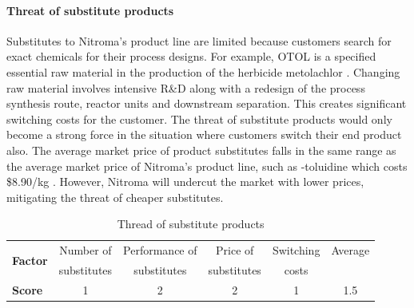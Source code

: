 \paragraph{Threat of substitute products}
Substitutes to Nitroma’s product line are limited because customers search for exact chemicals for their process designs. For example, OTOL is a specified essential raw material in the production of the herbicide metolachlor \cite{ncbi_ortho-toluidine_nodate}. Changing raw material involves intensive R\&D along with a redesign of the process synthesis route, reactor units and downstream separation. This creates significant switching costs for the customer. The threat of substitute products would only become a strong force in the situation where customers switch their end product also. The average market price of product substitutes falls in the same range as the average market price of Nitroma’s product line, such as \meta-toluidine which costs \$8.90/kg \cite{zauba_detailed_2021}. However, Nitroma will undercut the market with lower prices, mitigating the threat of cheaper substitutes.

\begin{table}[H]
\centering
\caption{Thread of substitute products}
\label{tab:substitute-products}
\begin{tabular}{lccccc}
\toprule
\multirow{2}{*}{\textbf{Factor}} & Number of    & Performance of  & Price of         & Switching & Average \\
                                 & substitutes & substitutes  & substitutes & costs \\\midrule
\textbf{Score}                   & 1          & 2         & 2               & 1         & \cellcolor{green}1.5      \\\bottomrule
\end{tabular}%
\end{table}

